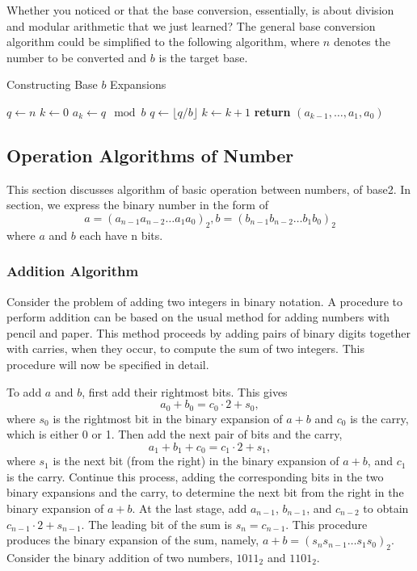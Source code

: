 Whether you noticed or that the base conversion, essentially, is about division and modular arithmetic
that we just learned? The general base conversion algorithm could be simplified to the following algorithm,
where $n$ denotes the number to be converted and $b$ is the target base.
\begin{algorithm}
    \caption{Constructing Base \( b \) Expansions}
    \begin{algorithmic}[H]
    \State $q \gets n$
    \State $k \gets 0$
    \State $a_k \gets q \mod b$
    \State $q \gets \lfloor q / b \rfloor$
    \State $k \gets k + 1$
    \EndWhile
    \State \textbf{return} $(a_{k-1}, \ldots, a_1, a_0)$ 
    \EndProcedure
    \end{algorithmic}
    \end{algorithm}
    \subsection{Operation Algorithms of Number}
        This section discusses algorithm of basic operation between numbers, of base2. 
        In section, we express the binary number in the form of 
        $$a=(a_{n-1}a_{n-2}\ldots a_1a_0)_2,b=(b_{n-1}b_{n-2}\ldots b_1b_0)_2$$
        where $a$ and $b$ each have n bits.
    \subsubsection*{Addition Algorithm}
    Consider the problem of adding two integers in binary notation. A procedure to perform addition can be based on the usual method for adding numbers with pencil and paper. This method proceeds by adding pairs of binary digits together with carries, when they occur, to compute the sum of two integers. This procedure will now be specified in detail.

    To add \( a \) and \( b \), first add their rightmost bits. This gives
    \[
    a_0 + b_0 = c_0 \cdot 2 + s_0,
    \]
    where \( s_0 \) is the rightmost bit in the binary expansion of \( a + b \) and \( c_0 \) is the carry, which is either 0 or 1. Then add the next pair of bits and the carry,
    \[
    a_1 + b_1 + c_0 = c_1 \cdot 2 + s_1,
    \]
    where \( s_1 \) is the next bit (from the right) in the binary expansion of \( a + b \), and \( c_1 \) is the carry. Continue this process, adding the corresponding bits in the two binary expansions and the carry, to determine the next bit from the right in the binary expansion of \( a + b \). At the last stage, add \( a_{n-1} \), \( b_{n-1} \), and \( c_{n-2} \) to obtain \( c_{n-1} \cdot 2 + s_{n-1} \). The leading bit of the sum is \( s_n = c_{n-1} \). This procedure produces the binary expansion of the sum, namely, \( a + b = (s_n s_{n-1} \ldots s_1 s_0)_2 \).
    Consider the binary addition of two numbers, \( 1011_2 \) and \( 1101_2 \).

